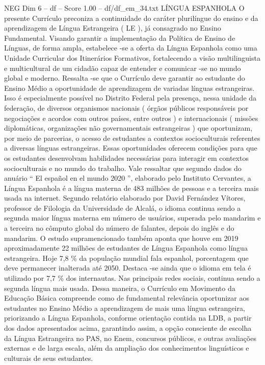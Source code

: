 \begin{textsample}{NEG Dim 6 – df – Score 1.00 – df/df\_em\_34.txt}  \label{ex:f6_neg_168}
LÍNGUA ESPANHOLA O presente Currículo preconiza a continuidade do caráter plurilíngue do ensino e da aprendizagem de Língua Estrangeira ( LE ), já consagrado no Ensino Fundamental.
Visando garantir a implementação da Política de Ensino de Línguas, de forma ampla, estabelece -se a oferta da Língua Espanhola como uma Unidade Curricular dos Itinerários Formativos, fortalecendo a visão multilinguista e multicultural de um cidadão capaz de entender e comunicar -se no mundo global e moderno.
Ressalta -se que o Currículo deve garantir ao estudante do Ensino Médio a oportunidade de aprendizagem de variadas línguas estrangeiras.
Isso é especialmente possível no Distrito Federal pela presença, nessa unidade da federação, de diversos organismos nacionais ( órgãos públicos responsáveis por negociações e acordos com outros países, entre outros ) e internacionais ( missões diplomáticas, organizações não governamentais estrangeiras ) que oportunizam, por meio de parcerias, o acesso de estudantes a contextos socioculturais referentes a diversas línguas estrangeiras.
Essas oportunidades oferecem condições para que os estudantes desenvolvam habilidades necessárias para interagir em contextos socioculturais e no mundo do trabalho.
Vale ressaltar que segundo dados do anuário “ El español en el mundo 2020 ”, elaborado pelo Instituto Cervantes, a Língua Espanhola é a língua materna de 483 milhões de pessoas e a terceira mais usada na internet.
Segundo relatório elaborado por David Fernández Vítores, professor de Filologia da Universidade de Alcalá, o idioma continua sendo a segunda maior língua materna em número de usuários, superada pelo mandarim e a terceira no cômputo global do número de falantes, depois do inglês e do mandarim.
O estudo supramencionado também aponta que houve em 2019 aproximadamente 22 milhões de estudantes de Língua Espanhola como língua estrangeira.
Hoje 7,8 \% da população mundial fala espanhol, porcentagem que deve permanecer inalterada até 2050.
Destaca -se ainda que o idioma em tela é utilizado por 7,7 \% dos internautas.
Nas principais redes sociais, continua sendo a segunda língua mais usada.
Dessa maneira, o Currículo em Movimento da Educação Básica compreende como de fundamental relevância oportunizar aos estudantes no Ensino Médio a aprendizagem de mais uma língua estrangeira, priorizando a Língua Espanhola, conforme orientação contida na LDB, a partir dos dados apresentados acima, garantindo assim, a opção consciente de escolha da Língua Estrangeira no PAS, no Enem, concursos públicos, e outras avaliações externas e de larga escala, além da ampliação dos conhecimentos linguísticos e culturais de seus estudantes.

\end{textsample}
